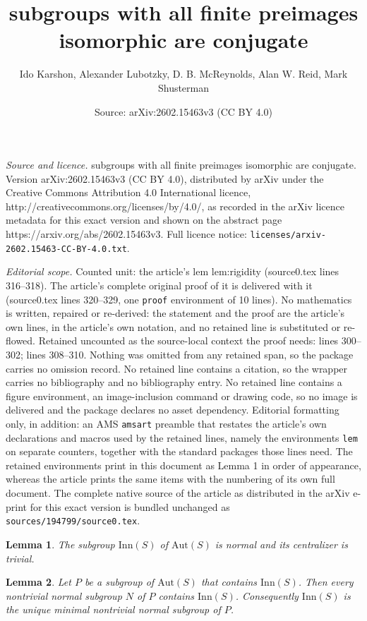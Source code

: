 \documentclass[10pt,a4paper]{amsart}
\title{subgroups with all finite preimages isomorphic are conjugate}
\author{Ido Karshon, Alexander Lubotzky, D. B. McReynolds, Alan W. Reid, Mark Shusterman}
\date{Source: arXiv:2602.15463v3 (CC BY 4.0)}
\newtheorem{lem}{Lemma}
\begin{document}
\maketitle

\noindent\emph{Source and licence.} subgroups with all finite preimages isomorphic are conjugate. Version arXiv:2602.15463v3 (CC BY 4.0), distributed by arXiv under the Creative Commons Attribution 4.0 International licence, http://creativecommons.org/licenses/by/4.0/, as recorded in the arXiv licence metadata for this exact version and shown on the abstract page https://arxiv.org/abs/2602.15463v3. Full licence notice: \texttt{licenses/arxiv-2602.15463-CC-BY-4.0.txt}.\par\smallskip

\noindent\textit{Editorial scope.} Counted unit: the article's lem lem:rigidity (source0.tex lines 316--318). The article's complete original proof of it is delivered with it (source0.tex lines 320--329, one \texttt{proof} environment of 10 lines). No mathematics is written, repaired or re-derived: the statement and the proof are the article's own lines, in the article's own notation, and no retained line is substituted or re-flowed.  Retained uncounted as the source-local context the proof needs: lines 300--302; lines 308--310.  Nothing was omitted from any retained span, so the package carries no omission record.  No retained line contains a citation, so the wrapper carries no bibliography and no bibliography entry.  No retained line contains a figure environment, an image-inclusion command or drawing code, so no image is delivered and the package declares no asset dependency.  Editorial formatting only, in addition: an AMS \texttt{amsart} preamble that restates the article's own declarations and macros used by the retained lines, namely the environments \texttt{lem} on separate counters, together with the standard packages those lines need.  The retained environments print in this document as Lemma 1 in order of appearance, whereas the article prints the same items with the numbering of its own full document.  The complete native source of the article as distributed in the arXiv e-print for this exact version is bundled unchanged as \texttt{sources/194799/source0.tex}.
\begin{lem} \label{TrivCentInn}
The subgroup $\mathrm{Inn}(S)$ of $\mathrm{Aut}(S)$ is normal and its centralizer is trivial.
\end{lem}

\begin{lem}\label{lem:centralizer-and-minimal-normal}
Let $P$ be a subgroup of $\mathrm{Aut}(S)$ that contains $\mathrm{Inn}(S)$. Then every nontrivial normal subgroup $N$ of $P$ contains $\mathrm{Inn}(S)$. Consequently $\mathrm{Inn}(S)$ is the unique minimal nontrivial normal subgroup of $P$.
\end{lem}
\end{document}
